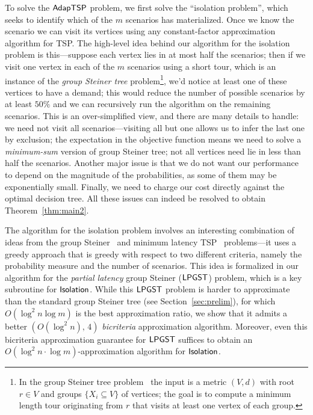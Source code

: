 \documentclass[11pt]{article}
\def\sse{\subseteq}
\def\isoprob{\ensuremath{{\sf Isolation}}\xspace}
\def\stsp{\ensuremath{{\sf AdapTSP}}\xspace}
\def\lpgst{\ensuremath{{\sf LPGST}}\xspace}
\begin{document}
To solve the \stsp problem, we first solve the ``isolation problem'', which seeks to identify which of the $m$
scenarios has materialized. Once we know the scenario we can visit its vertices using any constant-factor approximation algorithm for TSP. 
The high-level idea behind our algorithm for the isolation problem is this---suppose each vertex lies in at most half the scenarios; then if we
visit one vertex in each of the $m$ scenarios using a short tour, which is an instance of the {\em group Steiner tree} problem\footnote{In the group Steiner tree problem~\cite{gkr} the input is a metric $(V,d)$ with root $r\in V$ and groups $\{X_i\sse V\}$ of vertices; the goal is to compute a minimum length tour originating from $r$ that visits at least one vertex of each group.}, we'd
notice at least one of these vertices to have a demand; this would reduce the number of possible scenarios by at least $50\%$ and we can recursively run the algorithm on the remaining scenarios.
This is an over-simplified view, and there are many details to handle: we need not visit all
scenarios---visiting all but one allows us to infer the last one by exclusion; the expectation in the objective
function means we need to solve a \emph{minimum-sum} version of group Steiner tree; not all vertices need lie in less
than half the scenarios.  Another major issue is that we do not want our performance to depend on the magnitude of the
probabilities, as some of them may be exponentially small.  
Finally, we need to charge our cost directly against the optimal decision tree. 
All these issues can indeed be resolved to obtain Theorem~\ref{thm:main2}.




The algorithm for the isolation problem involves an interesting combination of ideas from the group Steiner~\cite{gkr,ccgg} and minimum
latency TSP~\cite{bccprs,cgrt,fhr} problems---it uses a greedy approach that is greedy with respect to two different
criteria, namely the probability measure and the number of scenarios. This idea is formalized in our algorithm for 
the {\em partial latency} group Steiner (\lpgst) problem, which is a key subroutine for \isoprob. While this \lpgst
problem is harder to approximate than the standard group Steiner tree (see Section~\ref{sec:prelim}), for which $O(\log^2n \log m)$ is the best approximation ratio, we show  that it admits a better
$\left(O(\log^2n),\,4\right)$ {\em bicriteria} approximation algorithm. Moreover, even this bicriteria approximation
guarantee for \lpgst suffices to obtain an $O(\log^2n\cdot \log m)$-approximation algorithm for \isoprob. 
\end{document}
